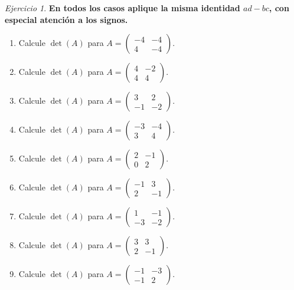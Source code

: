 \documentclass[12pt]{article}
\theoremstyle{remark}
\newtheorem{Ejer}[definicion]{Ejercicio}
\begin{document}
\begin{Ejer}

\textbf{En todos los casos aplique la misma identidad $ad-bc$, con especial atención a los signos.}
\begin{enumerate}[resume=banco]

\item Calcule $\det(A)$ para $A=\begin{pmatrix}-4&-4\\4&-4\end{pmatrix}$.

\item Calcule $\det(A)$ para $A=\begin{pmatrix}4&-2\\4&4\end{pmatrix}$.

\item Calcule $\det(A)$ para $A=\begin{pmatrix}3&2\\-1&-2\end{pmatrix}$.

\item Calcule $\det(A)$ para $A=\begin{pmatrix}-3&-4\\3&4\end{pmatrix}$.

\item Calcule $\det(A)$ para $A=\begin{pmatrix}2&-1\\0&2\end{pmatrix}$.

\item Calcule $\det(A)$ para $A=\begin{pmatrix}-1&3\\2&-1\end{pmatrix}$.

\item Calcule $\det(A)$ para $A=\begin{pmatrix}1&-1\\-3&-2\end{pmatrix}$.

\item Calcule $\det(A)$ para $A=\begin{pmatrix}3&3\\2&-1\end{pmatrix}$.

\item Calcule $\det(A)$ para $A=\begin{pmatrix}-1&-3\\-1&2\end{pmatrix}$.


\end{enumerate}
\end{Ejer}
\end{document}
